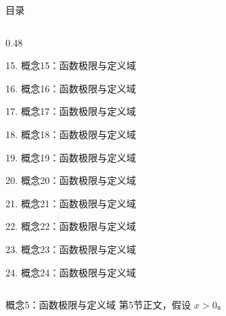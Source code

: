 \documentclass[aspectratio=169,10pt,fontset=fandol]{ctexbeamer}
\begin{document}
\begin{frame}[t,fragile]{目录}
\begin{columns}[T,onlytextwidth]
\begin{column}{0.48\textwidth}
{\color{gray!40}\small 15. 概念15：函数极限与定义域\par}\vspace{0.22em}
{\color{gray!40}\small 16. 概念16：函数极限与定义域\par}\vspace{0.22em}
{\color{gray!40}\small 17. 概念17：函数极限与定义域\par}\vspace{0.22em}
{\color{gray!40}\small 18. 概念18：函数极限与定义域\par}\vspace{0.22em}
{\color{gray!40}\small 19. 概念19：函数极限与定义域\par}\vspace{0.22em}
{\color{gray!40}\small 20. 概念20：函数极限与定义域\par}\vspace{0.22em}
{\color{gray!40}\small 21. 概念21：函数极限与定义域\par}\vspace{0.22em}
{\color{gray!40}\small 22. 概念22：函数极限与定义域\par}\vspace{0.22em}
{\color{gray!40}\small 23. 概念23：函数极限与定义域\par}\vspace{0.22em}
{\color{gray!40}\small 24. 概念24：函数极限与定义域\par}\vspace{0.22em}
\end{column}
\end{columns}
\end{frame}
\begin{frame}[t,fragile]{概念5：函数极限与定义域}
\normalsize
{\normalsize
第5节正文，假设 $x>0$。
}
\end{frame}
\end{document}
